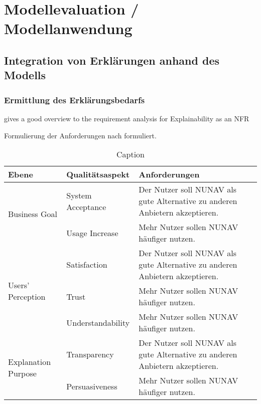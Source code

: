 \chapter{Modellevaluation / Modellanwendung}
\label{sec:model_evaluation}

\section{Integration von Erklärungen anhand des Modells}

\subsection{Ermittlung des Erklärungsbedarfs}

\cite{golledge1999wayfinding}

\cite{bovy2012route}

\cite{kohl_explainability_2019} gives a good overview to the requirement analysis for Explainability as an NFR

Formulierung der Anforderungen nach \cite{rajnish2010quality, wiegers1999writing, alexander2002writing} formuliert.

\begin{table}[]
    \centering
    \begin{tabular}{|p{}|p{}|p{}|}
        \hline
        \textbf{Ebene} & \textbf{Qualitätsaspekt} & \textbf{Anforderungen} \\
        \hline
        \multirow{2}{*}{Business Goal}      & System Acceptance & Der Nutzer soll NUNAV als gute Alternative zu anderen Anbietern akzeptieren.\\
        \cline{2-3}
                                            & Usage Increase & Mehr Nutzer sollen NUNAV häufiger nutzen.\\
        \hline
        \multirow{3}{*}{Users' Perception} & Satisfaction & Der Nutzer soll NUNAV als gute Alternative zu anderen Anbietern akzeptieren.\\
                                            \cline{2-3}
                                            & Trust & Mehr Nutzer sollen NUNAV häufiger nutzen.\\
                                            \cline{2-3}
                                            & Understandability & Mehr Nutzer sollen NUNAV häufiger nutzen.\\
        \hline
        \multirow{2}{*}{Explanation Purpose} & Transparency & Der Nutzer soll NUNAV als gute Alternative zu anderen Anbietern akzeptieren.\\
        \cline{2-3}
                                            & Persuasiveness & Mehr Nutzer sollen NUNAV häufiger nutzen.\\
        \hline
    \end{tabular}
    \caption{Caption}
    \label{tab:my_label}
\end{table}

